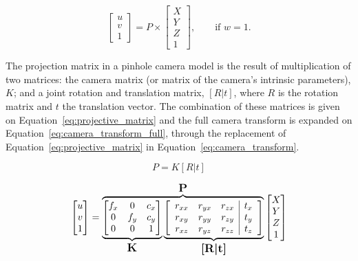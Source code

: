 \begin{equation}
	\label{eq:projective-geometry-pixel}
	\begin{bmatrix}
		u \\ v \\ 1
	\end{bmatrix}
= P \times 
\begin{bmatrix}
		X \\ Y \\ Z \\ 1
\end{bmatrix}, \qquad \text{if } w = 1.
\end{equation}

The projection matrix in a pinhole camera model is the result of multiplication of two matrices: the camera matrix (or matrix of the camera's intrinsic parameters), $K$; and a joint rotation and translation matrix, $[R|t]$, where $R$ is the rotation matrix and $t$ the translation vector. The combination of these matrices is given on Equation~\eqref{eq:projective_matrix} and the full camera transform is expanded on Equation~\eqref{eq:camera_transform_full}, through the replacement of Equation~\eqref{eq:projective_matrix} in Equation~\eqref{eq:camera_transform}.

\begin{equation}
	\label{eq:projective_matrix}
	P = K[R|t]
\end{equation}

\begin{equation}
	\label{eq:camera_transform_full}
	\begin{bmatrix}
		u \\
		v \\
		1
	\end{bmatrix}
	= 
	\overbrace{
		\underbrace{
			\begin{bmatrix}
				f_x & 0 & c_x \\
				0 & f_y & c_y \\
				0 & 0 & 1 
			\end{bmatrix}
		}_\text{\large\textbf{K}}
		\underbrace{
			\left[
				\begin{array}{ccc|c}
					r_{xx} & r_{yx} & r_{zx} & t_x \\
					r_{xy} & r_{yy} & r_{zy} & t_y \\
					r_{xz} & r_{yz} & r_{zz} & t_z 
				\end{array}
		\right]
		}_\text{\large\textbf{[R|t]}}
	}^\text{\large\textbf{P}}
	\begin{bmatrix}
		X \\
		Y \\
		Z \\
		1
	\end{bmatrix}
\end{equation}

